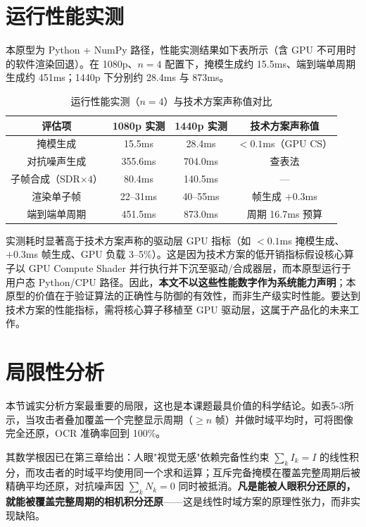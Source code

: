 \section{运行性能实测}

本原型为 Python + NumPy 路径，性能实测结果如下表所示（含 GPU 不可用时的软件渲染回退）。在 1080p、$n=4$ 配置下，掩模生成约 15.5ms、端到端单周期生成约 451ms；1440p 下分别约 28.4ms 与 873ms。

\begin{table}[htbp]
  \centering
  \caption{运行性能实测（$n=4$）与技术方案声称值对比}
  \begin{tabular}{cccc}
    \toprule
    评估项 & 1080p 实测 & 1440p 实测 & 技术方案声称值 \\
    \midrule
    掩模生成 & 15.5ms & 28.4ms & $<0.1$ms（GPU CS） \\
    对抗噪声生成 & 355.6ms & 704.0ms & 查表法 \\
    子帧合成（SDR$\times4$） & 80.4ms & 140.5ms & — \\
    渲染单子帧 & 22--31ms & 40--55ms & 帧生成 $+0.3$ms \\
    端到端单周期 & 451.5ms & 873.0ms & 周期 16.7ms 预算 \\
    \bottomrule
  \end{tabular}
\end{table}

实测耗时显著高于技术方案声称的驱动层 GPU 指标（如 $<0.1$ms 掩模生成、$+0.3$ms 帧生成、GPU 负载 3--5\%）。这是因为技术方案的低开销指标假设核心算子以 GPU Compute Shader 并行执行并下沉至驱动/合成器层，而本原型运行于用户态 Python/CPU 路径。因此，\textbf{本文不以这些性能数字作为系统能力声明}；本原型的价值在于验证算法的正确性与防御的有效性，而非生产级实时性能。要达到技术方案的性能指标，需将核心算子移植至 GPU 驱动层，这属于产品化的未来工作。

\section{局限性分析}

本节诚实分析方案最重要的局限，这也是本课题最具价值的科学结论。如表5-3所示，当攻击者叠加覆盖一个完整显示周期（$\ge n$ 帧）并做时域平均时，可将图像完全还原，OCR 准确率回到 100\%。

其数学根因已在第三章给出：人眼"视觉无感"依赖完备性约束 $\sum_k I_k = I$ 的线性积分，而攻击者的时域平均使用同一个求和运算；互斥完备掩模在覆盖完整周期后被精确平均还原，对抗噪声因 $\sum_k N_k = 0$ 同时被抵消。\textbf{凡是能被人眼积分还原的，就能被覆盖完整周期的相机积分还原}——这是线性时域方案的原理性张力，而非实现缺陷。

